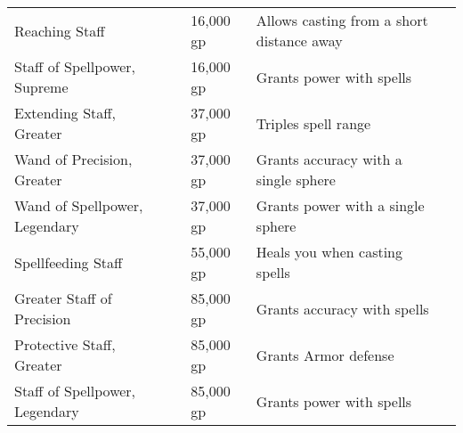 \begin{longtabuwrapper}
\begin{longtabu}{l l l X l}
Reaching Staff &  & 16,000 gp & Allows casting from a short distance away & \pageref{item:Reaching Staff} \\
Staff of Spellpower, Supreme &  & 16,000 gp & Grants  power with spells & \pageref{item:Staff of Spellpower, Supreme} \\
Extending Staff, Greater &  & 37,000 gp & Triples spell range & \pageref{item:Extending Staff, Greater} \\
Wand of Precision, Greater &  & 37,000 gp & Grants  accuracy with a single sphere & \pageref{item:Wand of Precision, Greater} \\
Wand of Spellpower, Legendary &  & 37,000 gp & Grants  power with a single sphere & \pageref{item:Wand of Spellpower, Legendary} \\
Spellfeeding Staff &  & 55,000 gp & Heals you when casting spells & \pageref{item:Spellfeeding Staff} \\
Greater Staff of Precision &  & 85,000 gp & Grants  accuracy with spells & \pageref{item:Greater Staff of Precision} \\
Protective Staff, Greater &  & 85,000 gp & Grants  Armor defense & \pageref{item:Protective Staff, Greater} \\
Staff of Spellpower, Legendary &  & 85,000 gp & Grants  power with spells & \pageref{item:Staff of Spellpower, Legendary} \\
\end{longtabu}
\end{longtabuwrapper}
